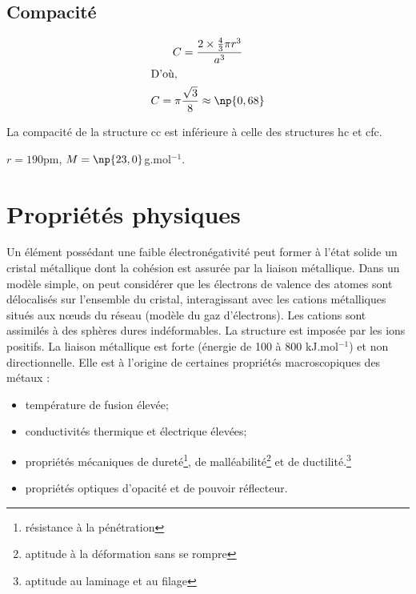 \subsection{Compacité}
\begin{gather}
    C = \frac{2\times \frac{4}{3} \pi r^3}{a^3}\\
    \intertext{D'où,}
    C = \pi \frac{\sqrt{3}}{8} \approx \np{0,68}
\end{gather}
\begin{rem}
    La compacité de la structure cc est inférieure à celle
    des structures hc et cfc.
\end{rem}
\begin{ex}[Na]
    $r = 190$pm, $M = \np{23,0}$g.mol$^{-1}$.
\end{ex}

\section{Propriétés physiques}
Un élément possédant une faible électronégativité peut former
à l’état solide un cristal métallique dont la cohésion est
assurée par la liaison métallique.
Dans un modèle simple, on peut considérer que les électrons
de valence des atomes sont délocalisés sur l’ensemble du
cristal, interagissant avec les cations métalliques situés
aux n\oe uds du réseau (modèle du gaz d’électrons).
Les cations sont assimilés à des sphères dures
indéformables. La structure est imposée par les ions positifs.
La liaison métallique est forte (énergie de 100 à 800 kJ.mol$^{-1}$)
et non directionnelle. Elle est à l’origine de certaines
propriétés macroscopiques des métaux :
\begin{itemize}
    \item température de fusion élevée; 
    \item conductivités thermique et électrique élevées;
    \item propriétés mécaniques de dureté\footnote{résistance à
        la pénétration}, de malléabilité\footnote{aptitude à la
        déformation sans se rompre} et de
        ductilité.\footnote{aptitude au laminage et au filage}
    \item propriétés optiques d'opacité et de pouvoir réflecteur.
\end{itemize}

